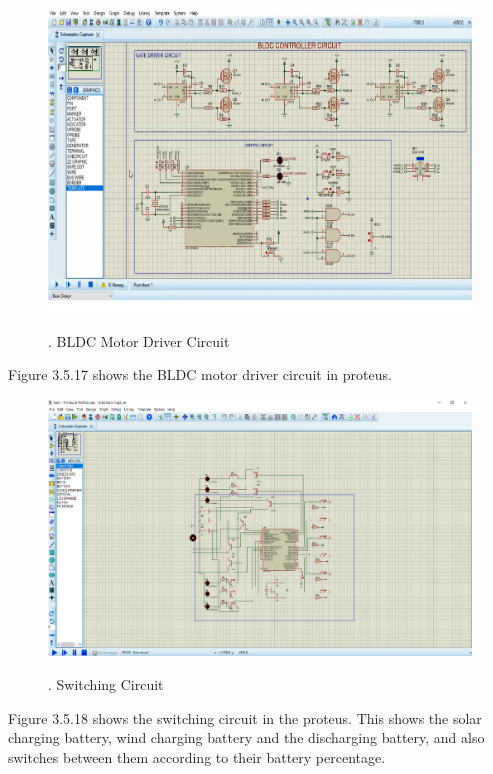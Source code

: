 \documentclass[a4paper,12pt]{article}
\begin{document}
\newpage
\begin{figure}[!h]
\centering
\includegraphics[scale=0.3]{ckt.png}\\
\caption{. BLDC Motor Driver Circuit}
\end{figure}
Figure 3.5.17 shows the BLDC motor driver circuit in proteus.\\

\begin{figure}[!h]
\centering
\includegraphics[scale=0.5]{swckt.png}\\
\caption{. Switching Circuit}
\end{figure}
Figure 3.5.18 shows the switching circuit in the proteus. This shows the solar charging battery, wind charging battery and the discharging battery, and also switches between them according to their battery percentage.\\
\end{document}
